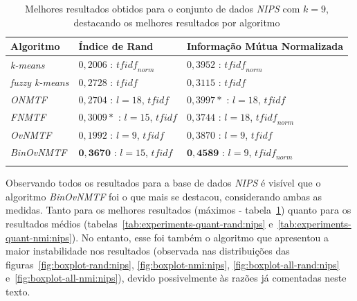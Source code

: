 \documentclass[
    12pt,                %
    oneside,            %
    a4paper,            %
    english,            %
    brazil                %
    ]{abntex2ppgsi}
\begin{document}
\begin{table}[H]
\centering
    \caption{Melhores resultados obtidos para o conjunto de dados \textit{NIPS} com $k = 9$, destacando os melhores resultados por algoritmo}
    \begin{tabular}{lll}
        \hline
        \textbf{Algoritmo}              & \textbf{Índice de Rand} & \textbf{Informação Mútua Normalizada} \\
        \hline
        \textit{k-means}       & $0,2006$ : $\textit{tfidf}_{norm}$           & $0,3952$ : $\textit{tfidf}_{norm}$ \\
        \textit{fuzzy k-means} & $0,2728$ : $\textit{tfidf}$                  & $0,3115$ : $\textit{tfidf}$ \\
        \textit{ONMTF}         & $0,2704$ : $l=18$, $\textit{tfidf}$          & $0,3997*$ : $l=18$, $\textit{tfidf}$\\
        \textit{FNMTF}         & $0,3009*$ : $l=15$, $\textit{tfidf}$         & $0,3744$ : $l=18$, $\textit{tfidf}_{norm}$ \\
        \textit{OvNMTF}        & $0,1992$ : $l=9$, $\textit{tfidf}$           & $0,3870$ : $l=9$, $\textit{tfidf}$\\
        \textit{BinOvNMTF}     & $\mathbf{0,3670}$ : $l=15$, $\textit{tfidf}$ & $\mathbf{0,4589}$ : $l=9$, $\textit{tfidf}_{norm}$ \\
        \hline \\
    \end{tabular}
    \label{tab:experiments-quant-best-nmi:nips}
\end{table}

Observando todos os resultados para a base de dados \textit{NIPS} é visível que o algoritmo \textit{BinOvNMTF} foi o que mais se destacou, considerando ambas as medidas.
Tanto para os melhores resultados (máximos - tabela~\ref{tab:experiments-quant-best-nmi:nips}) quanto para os resultados médios (tabelas~\ref{tab:experiments-quant-rand:nips} e~\ref{tab:experiments-quant-nmi:nips}). No entanto, esse foi também o algoritmo que apresentou a maior instabilidade nos resultados (observada nas distribuições das figuras~\ref{fig:boxplot-rand:nips}, \ref{fig:boxplot-nmi:nips}, \ref{fig:boxplot-all-rand:nips} e~\ref{fig:boxplot-all-nmi:nips}), devido possivelmente às razões já comentadas neste texto. %
\end{document}
